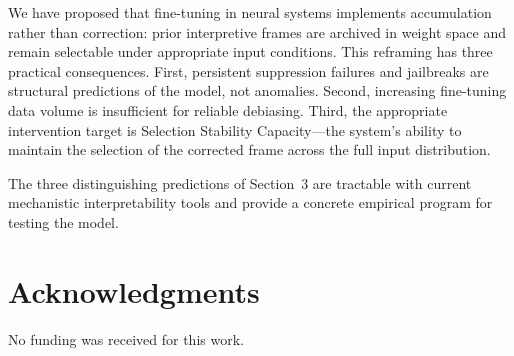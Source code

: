 \documentclass[12pt]{article}
\begin{document}
We have proposed that fine-tuning in neural systems implements
accumulation rather than correction: prior interpretive frames are
archived in weight space and remain selectable under appropriate
input conditions. This reframing has three practical consequences.
First, persistent suppression failures and jailbreaks are structural
predictions of the model, not anomalies. Second, increasing
fine-tuning data volume is insufficient for reliable debiasing.
Third, the appropriate intervention target is Selection Stability
Capacity---the system's ability to maintain the selection of the
corrected frame across the full input distribution.

The three distinguishing predictions of Section~3 are tractable
with current mechanistic interpretability tools and provide a
concrete empirical program for testing the model.

\section*{Acknowledgments}

No funding was received for this work.
\end{document}
